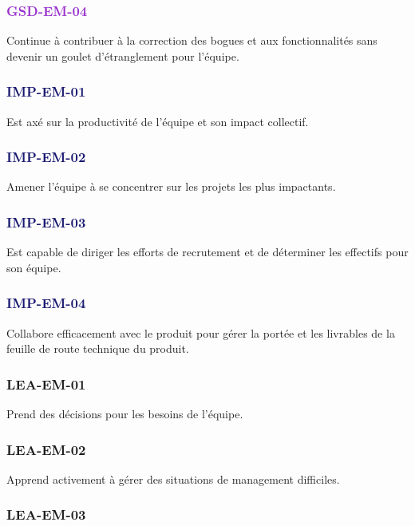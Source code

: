 \documentclass[a4paper, french, openany, 12pt]{book}
\newcommand\str[1]{\textcolor{DarkOrchid}{\textbf{\uppercase{gsd-{#1}}}}}
\newcommand\wis[1]{\textcolor{MidnightBlue}{\textbf{\uppercase{imp-{#1}}}}}
\newcommand\cha[1]{\textcolor{OliveGreen}{\textbf{\uppercase{lea-{#1}}}}}
\begin{document}
\begin{multicols}{2}
  \subsubsection*{\str{em-04}}

  Continue à contribuer à la correction des bogues et aux fonctionnalités sans devenir un goulet d'étranglement pour 
  l'équipe.

  \subsubsection*{\wis{em-01}}

  Est axé sur la productivité de l'équipe et son impact collectif.

  \subsubsection*{\wis{em-02}}

  Amener l'équipe à se concentrer sur les projets les plus impactants.

  \subsubsection*{\wis{em-03}}

  Est capable de diriger les efforts de recrutement et de déterminer les effectifs pour son équipe.
  
  \subsubsection*{\wis{em-04}}

  Collabore efficacement avec le produit pour gérer la portée et les livrables de la feuille de route technique du 
  produit.

  \subsubsection*{\cha{em-01}}

  Prend des décisions pour les besoins de l'équipe.
  
  \subsubsection*{\cha{em-02}}

  Apprend activement à gérer des situations de management difficiles.

  \subsubsection*{\cha{em-03}}
  

\end{multicols}
\end{document}
